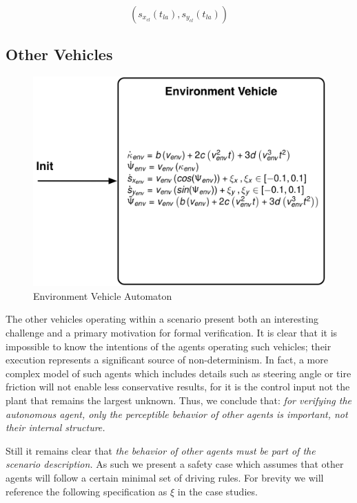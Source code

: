 \documentclass{easychair}
\theoremstyle{theorem}
\theoremstyle{remark}
\begin{document}
\begin{equation}
	\left(s_{x_{cl}}(t_{la}), s_{y_{cl}}(t_{la})\right)
\end{equation} 

\subsection{Other Vehicles}
	\begin{figure}[h]
		\centering
		\includegraphics[scale=0.35]{figures/environment}
		\caption{Environment Vehicle Automaton}
	\end{figure}
The other vehicles operating within a scenario present both an interesting challenge and a primary motivation for formal verification. It is clear that it is impossible to know the intentions of the agents operating such vehicles; their execution represents a significant source of non-determinism. In fact, a more complex model of such agents which includes details such as steering angle or tire friction will not enable less conservative results, for it is the control input not the plant that remains the largest unknown. Thus, we conclude that:
{\it for verifying the autonomous agent, only the perceptible behavior of other agents is important, not their internal structure.}



Still it remains clear that {\it the behavior of other agents must be part of the scenario description.} As such we present a safety case which assumes that other agents will follow a certain minimal set of driving rules. For brevity we will reference the following specification as $\xi$ in the case studies.%
\end{document}
